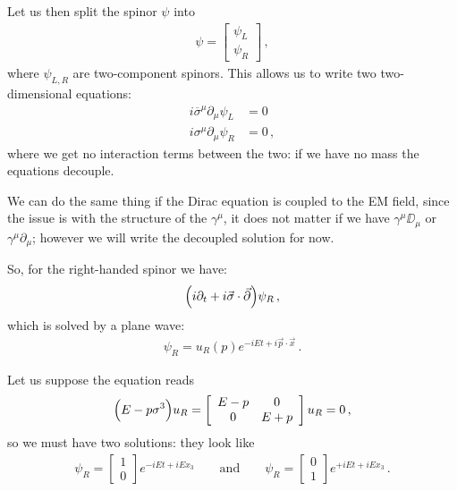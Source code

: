 \documentclass[main.tex]{subfiles}
\begin{document}
Let us then split the spinor \(\psi \) into 
%
\begin{subequations}
\begin{align}
\psi = \left[\begin{array}{c}
\psi_{L} \\ 
\psi_{R}
\end{array}\right]
\,,
\end{align}
\end{subequations}
%
where \(\psi_{L, R}\) are two-component spinors. This allows us to write two two-dimensional equations: 
%
\begin{subequations}
\begin{align}
i \overline{\sigma}^{\mu } \partial_{\mu } \psi_{L} &= 0 \\
i \sigma^{\mu } \partial_{\mu } \psi_{R} &= 0
\,,
\end{align}
\end{subequations}
%
where we get no interaction terms between the two: if we have no mass the equations decouple. 

We can do the same thing if the Dirac equation is coupled to the EM field, since the issue is with the structure of the \(\gamma^{\mu }\), it does not matter if we have \(\gamma^{\mu } \DD_{\mu }\) or \(\gamma^{\mu } \partial_{\mu }\); however we will write the decoupled solution for now.

So, for the right-handed spinor we have:
%
\begin{align}
\qty(i \partial_{t} + i \vec{\sigma} \cdot \vec{\partial}) \psi_{R}
\,,
\end{align}
%
which is solved by a plane wave: 
%
\begin{align}
\psi_{R} = u_R (p) e^{-iEt + i \vec{p} \cdot \vec{x}}
\,.
\end{align}

Let us suppose the equation reads 
%
\begin{subequations}
\begin{align}
\qty(E - p \sigma^{3}) u_R = \left[\begin{array}{cc}
E-p & 0 \\ 
0 & E+p
\end{array}\right] u_{R} = 0
\,,
\end{align}
\end{subequations}
%
so we must have two solutions: they look like 
%
\begin{subequations}
\begin{align}
\psi_{R} = \left[\begin{array}{c}
1 \\ 
0
\end{array}\right] e^{-i Et + i E x_3 }
\qquad \text{and} \qquad
\psi_{R} = \left[\begin{array}{c}
0 \\ 
1
\end{array}\right] e^{+i Et + i E x_3 }  
\,.
\end{align}
\end{subequations}
\end{document}

